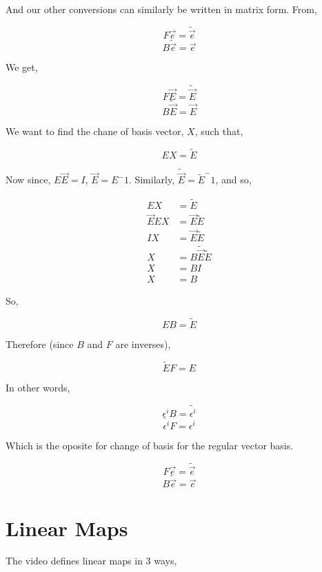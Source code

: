 \documentclass[12pt]{book}
\theoremstyle{plain}
\theoremstyle{definition}
\theoremstyle{ppart}
\theoremstyle{case}
\theoremstyle{solution}
\begin{document}
And our other conversions can similarly be written in matrix form. From,

\[ F \vec{e} = \widetilde{\vec{e}} \]
\[ B \widetilde{\vec{e}} = \vec{e} \]

We get,

\[ F \vec{E} = \widetilde{\vec{E}} \]
\[ B \widetilde{\vec{E}} = \vec{E} \]

We want to find the chane of basis vector, $X$, such that,

\[ E X = \widetilde{E} \]

Now since, $E \vec{E} = I$, $\vec{E} = E^-1$. Similarly,
$\widetilde{\vec{E}} = \widetilde{E}^-1$, and so,

\begin{align*}
  E X &= \widetilde{E} \\
  \vec{E} E X &= \vec{E} \widetilde{E} \\
  I X &= \vec{E} \widetilde{E} \\
  X &= B \widetilde{\vec{E}} \widetilde{E} \\
  X &= B I \\
  X &= B
\end{align*}

So,

\[ E B = \widetilde{E} \]

Therefore (since $B$ and $F$ are inverses),

\[ \widetilde{E} F = E\]

In other words,

\[ \epsilon^i B = \widetilde{\epsilon^i} \]
\[ \widetilde{\epsilon^i} F = \epsilon^i \]

Which is the oposite for change of basis for the regular vector basis.

\[ F \vec{e} = \widetilde{\vec{e}} \]
\[ B \widetilde{\vec{e}} = \vec{e} \]


\chapter{Linear Maps}

The video \cite{youtube:tensor6} defines linear maps in 3 ways,
\end{document}
